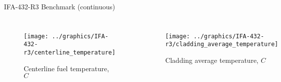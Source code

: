 \begin{frame}{IFA-432-R3 Benchmark (continuous)}
  \footnotesize 
  
  \begin{columns}[t]


  \begin{figure}[h]
    \texttt{[image: ../graphics/IFA-432-r3/centerline\_temperature]}
    \caption{Centerline fuel temperature, $C$}
  \end{figure}  


  \begin{figure}[h]
    \texttt{[image: ../graphics/IFA-432-r3/cladding\_average\_temperature]}    
    \caption{Cladding average temperature, $C$}
  \end{figure}  
  
  \end{columns}

\end{frame}
